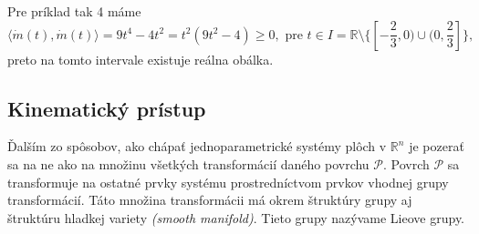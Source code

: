 Pre príklad tak 4 máme
$$\langle \dot{m}(t), \dot{m}(t) \rangle = 9t^4 - 4t^2 = t^2(9t^2 - 4)\geq 0, \text{ pre } t \in I = \mathbb{R} \setminus \{ [-\frac{2}{3}, 0) \cup( 0, \frac{2}{3}] \}, $$
preto na tomto intervale existuje reálna obálka.

\subsection{Kinematický prístup}
Ďalším zo spôsobov, ako chápať jednoparametrické systémy plôch v $\mathbb{R}^n$ je pozerať sa na ne ako na množinu všetkých transformácií daného povrchu $\mathcal{P}$. Povrch $\mathcal{P}$ sa transformuje na ostatné prvky systému prostredníctvom prvkov vhodnej grupy transformácií. Táto množina transformácii má okrem štruktúry grupy aj štruktúru hladkej variety \textit{(smooth manifold)}. Tieto grupy nazývame Lieove grupy.

